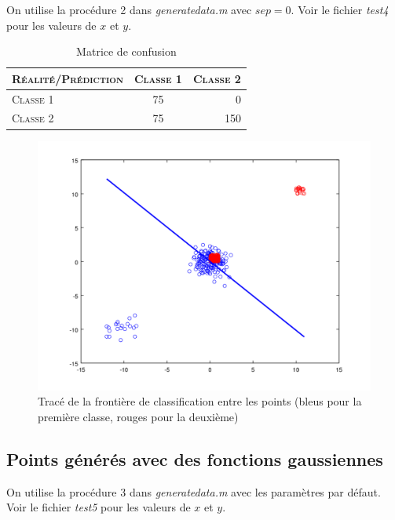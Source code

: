 \documentclass{article}
\begin{document}
On utilise la procédure 2 dans \emph{generatedata.m} avec $sep=0$. Voir le fichier \emph{test4} pour les valeurs de $x$ et $y$.

     \begin{table}[H]
       \caption{Matrice de confusion}
       \begin{tabular}{|l|c|r|}
         \hline
         \textsc{Réalité/Prédiction} & \textsc{Classe 1} & \textsc{Classe 2}\\
         \hline
         \textsc{Classe 1} & 75 & 0\\
         \hline
         \textsc{Classe 2} & 75 & 150\\
         \hline
       \end{tabular}
     \end{table}

         \begin{figure}
           \begin{center}
             \subfigure\includegraphics[scale=0.3]{images/line2D4.png}
             \caption{Tracé de la frontière de classification entre les points (bleus pour la première classe, rouges pour la deuxième)}
           \end{center}
         \end{figure}

\subsection{Points générés avec des fonctions gaussiennes}

On utilise la procédure 3 dans \emph{generatedata.m} avec les paramètres par défaut. Voir le fichier \emph{test5} pour les valeurs de $x$ et $y$.
\end{document}
